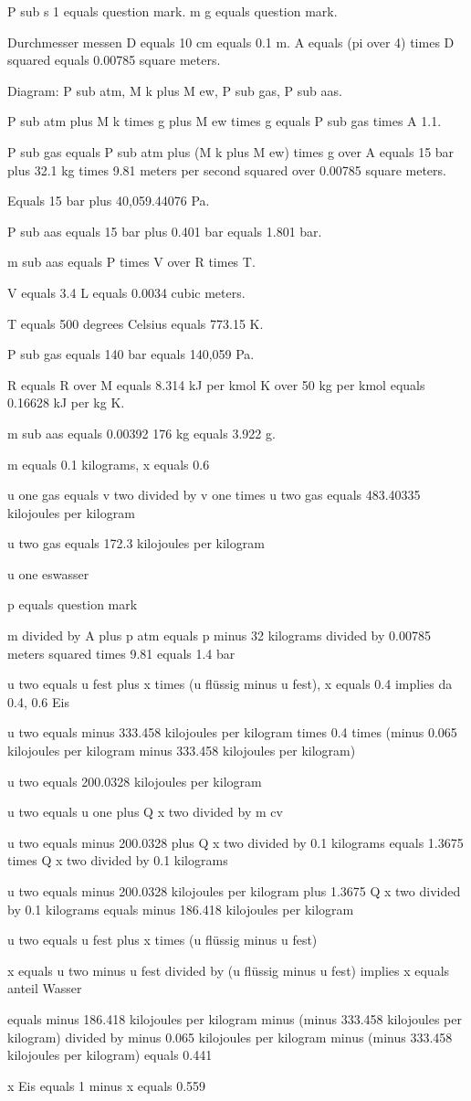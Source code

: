 P sub s 1 equals question mark. m g equals question mark.

Durchmesser messen D equals 10 cm equals 0.1 m. A equals (pi over 4) times D squared equals 0.00785 square meters.

Diagram: P sub atm, M k plus M ew, P sub gas, P sub aas.

P sub atm plus M k times g plus M ew times g equals P sub gas times A 1.1.

P sub gas equals P sub atm plus (M k plus M ew) times g over A equals 15 bar plus 32.1 kg times 9.81 meters per second squared over 0.00785 square meters.

Equals 15 bar plus 40,059.44076 Pa.

P sub aas equals 15 bar plus 0.401 bar equals 1.801 bar.

m sub aas equals P times V over R times T.

V equals 3.4 L equals 0.0034 cubic meters.

T equals 500 degrees Celsius equals 773.15 K.

P sub gas equals 140 bar equals 140,059 Pa.

R equals R over M equals 8.314 kJ per kmol K over 50 kg per kmol equals 0.16628 kJ per kg K.

m sub aas equals 0.00392 176 kg equals 3.922 g.

m equals 0.1 kilograms, x equals 0.6

u one gas equals v two divided by v one times u two gas equals 483.40335 kilojoules per kilogram

u two gas equals 172.3 kilojoules per kilogram

u one eswasser

p equals question mark

m divided by A plus p atm equals p minus 32 kilograms divided by 0.00785 meters squared times 9.81 equals 1.4 bar

u two equals u fest plus x times (u flüssig minus u fest), x equals 0.4 implies da 0.4, 0.6 Eis

u two equals minus 333.458 kilojoules per kilogram times 0.4 times (minus 0.065 kilojoules per kilogram minus 333.458 kilojoules per kilogram)

u two equals 200.0328 kilojoules per kilogram

u two equals u one plus Q x two divided by m cv

u two equals minus 200.0328 plus Q x two divided by 0.1 kilograms equals 1.3675 times Q x two divided by 0.1 kilograms

u two equals minus 200.0328 kilojoules per kilogram plus 1.3675 Q x two divided by 0.1 kilograms equals minus 186.418 kilojoules per kilogram

u two equals u fest plus x times (u flüssig minus u fest)

x equals u two minus u fest divided by (u flüssig minus u fest) implies x equals anteil Wasser

equals minus 186.418 kilojoules per kilogram minus (minus 333.458 kilojoules per kilogram) divided by minus 0.065 kilojoules per kilogram minus (minus 333.458 kilojoules per kilogram) equals 0.441

x Eis equals 1 minus x equals 0.559